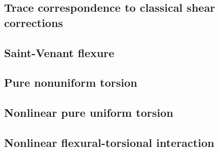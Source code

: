 \FloatBarrier


\subsection{Trace correspondence to classical shear corrections}
\label{sec:shape-0012}


\subsection{Saint-Venant flexure }\label{sec:frame-0012}

\clearpage

\subsection{Pure nonuniform torsion }\label{sec:frame-0021}
% 

\subsection{Nonlinear pure uniform torsion }\label{sec:frame-0015}
% 
\clearpage

\subsection{Nonlinear flexural-torsional interaction }\label{sec:frame-1041}

\clearpage 

% 

% 

% 


